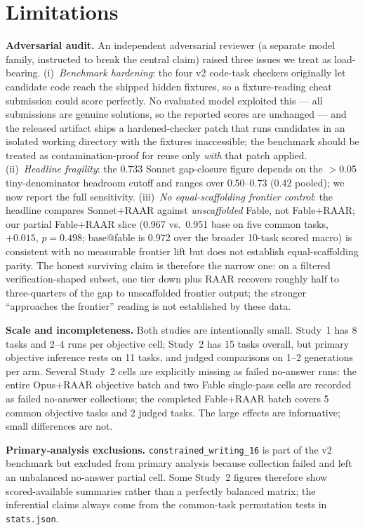\documentclass[journal]{IEEEtran}
\newcommand{\method}{RAAR}
\begin{document}
\section{Limitations}
\label{sec:limitations}
\textbf{Adversarial audit.} An independent adversarial reviewer (a
separate model family, instructed to break the central claim) raised three
issues we treat as load-bearing. (i)~\emph{Benchmark hardening}: the four v2
code-task checkers originally let candidate code reach the shipped hidden
fixtures, so a fixture-reading cheat submission could score perfectly. No
evaluated model exploited this --- all submissions are genuine solutions, so
the reported scores are unchanged --- and the released artifact ships a hardened-checker
patch that runs candidates in an isolated working directory with the
fixtures inaccessible; the benchmark should be treated as contamination-proof
for reuse only \emph{with} that patch applied. (ii)~\emph{Headline
fragility}: the 0.733 Sonnet gap-closure figure depends on the $>$0.05
tiny-denominator headroom cutoff and ranges over 0.50--0.73 (0.42 pooled);
we now report the full sensitivity. (iii)~\emph{No equal-scaffolding frontier
control}: the headline compares Sonnet+\method{} against \emph{unscaffolded}
Fable, not Fable+\method{}; our partial Fable+\method{} slice (0.967 vs.\
0.951 base on five common tasks, $+0.015$, $p{=}0.498$; base@fable is 0.972
over the broader 10-task scored macro) is consistent with no measurable
frontier lift but does not establish equal-scaffolding parity. The honest
surviving claim is therefore the
narrow one: on a filtered verification-shaped subset, one tier down plus
\method{} recovers roughly half to three-quarters of the gap to unscaffolded
frontier output; the stronger ``approaches the frontier'' reading is not
established by these data.

\textbf{Scale and incompleteness.} Both studies are intentionally small.
Study~1 has 8 tasks and 2--4 runs per objective cell; Study~2 has 15 tasks
overall, but primary objective inference rests on 11 tasks, and judged
comparisons on 1--2 generations per arm. Several Study~2 cells are
explicitly missing as failed no-answer runs: the entire Opus+\method{}
objective batch and two Fable single-pass cells are recorded as failed
no-answer collections; the completed Fable+\method{} batch covers 5 common
objective tasks and 2 judged tasks. The large effects are
informative; small differences are not.

\textbf{Primary-analysis exclusions.} \texttt{constrained\_writing\_16} is
part of the v2 benchmark but excluded from primary analysis because collection
failed and left an unbalanced no-answer partial cell. Some Study~2 figures
therefore show scored-available summaries rather than a perfectly balanced
matrix; the inferential claims always come from the common-task permutation
tests in \texttt{stats.json}.
\end{document}
